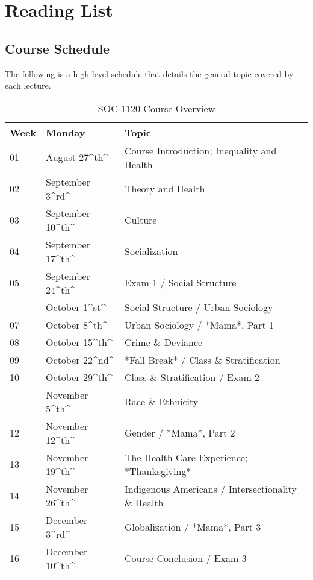 \documentclass[]{book}
\theoremstyle{definition}
\theoremstyle{definition}
\theoremstyle{definition}
\theoremstyle{remark}
\begin{document}
\hypertarget{part-reading-list}{%
\part{Reading List}\label{part-reading-list}}

\hypertarget{course-schedule}{%
\chapter{Course Schedule}\label{course-schedule}}

The following is a high-level schedule that details the general topic
covered by each lecture.

\begin{table}

\caption{\label{tab:unnamed-chunk-1}SOC 1120 Course Overview}
\centering
\begin{tabular}[t]{lll}
\toprule
Week & Monday & Topic\\
\midrule
01 & August 27\textasciicircum{}th\textasciicircum{} & Course Introduction; Inequality and Health\\
02 & September 3\textasciicircum{}rd\textasciicircum{} & Theory and Health\\
03 & September 10\textasciicircum{}th\textasciicircum{} & Culture\\
04 & September 17\textasciicircum{}th\textasciicircum{} & Socialization\\
05 & September 24\textasciicircum{}th\textasciicircum{} & Exam 1 / Social Structure\\
\addlinespace
06 & October 1\textasciicircum{}st\textasciicircum{} & Social Structure / Urban Sociology\\
07 & October 8\textasciicircum{}th\textasciicircum{} & Urban Sociology / *Mama*, Part 1\\
08 & October 15\textasciicircum{}th\textasciicircum{} & Crime \& Deviance\\
09 & October 22\textasciicircum{}nd\textasciicircum{} & *Fall Break* / Class \& Stratification\\
10 & October 29\textasciicircum{}th\textasciicircum{} & Class \& Stratification / Exam 2\\
\addlinespace
11 & November 5\textasciicircum{}th\textasciicircum{} & Race \& Ethnicity\\
12 & November 12\textasciicircum{}th\textasciicircum{} & Gender / *Mama*, Part 2\\
13 & November 19\textasciicircum{}th\textasciicircum{} & The Health Care Experience; *Thanksgiving*\\
14 & November 26\textasciicircum{}th\textasciicircum{} & Indigenous Americans / Intersectionality \& Health\\
15 & December 3\textasciicircum{}rd\textasciicircum{} & Globalization / *Mama*, Part 3\\
16 & December 10\textasciicircum{}th\textasciicircum{} & Course Conclusion / Exam 3\\
\bottomrule
\end{tabular}
\end{table}
\end{document}
